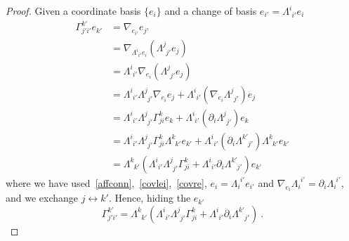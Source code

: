     \begin{proof}
        Given a coordinate basis $\{e_i\}$ and a change of basis $e_{i'} = \Lambda^{i}_{\phantom{i} i'} e_i$
        \begin{equation*}
        \begin{aligned}
            \Gamma^{k'}_{j'i'} e_{k'} & = \nabla_{e_{i'}} e_{j'} \\ & = \nabla_{\Lambda^{i}_{\phantom{i} i'} e_i} (\Lambda^{j}_{\phantom{j} j'} e_j) \\ & = \Lambda^{i}_{\phantom{i} i'} \nabla_{e_i} (\Lambda^{j}_{\phantom{j} j'} e_j) \\ & = \Lambda^{i}_{\phantom{i} i'} \Lambda^{j}_{\phantom{j} j'}\nabla_{e_i} e_j + \Lambda^{i}_{\phantom{i} i'}  (\nabla_{e_i} \Lambda^{j}_{\phantom{j} j'}) e_j \\ & = \Lambda^{i}_{\phantom{i} i'} \Lambda^{j}_{\phantom{j} j'} \Gamma^k_{ji} e_k + \Lambda^{i}_{\phantom{i} i'} (\partial_i \Lambda^{j}_{\phantom{j} j'}) e_k \\ & = \Lambda^{i}_{\phantom{i} i'} \Lambda^{j}_{\phantom{j} j'} \Gamma^k_{ji} \Lambda^{k}_{\phantom{k} k'} e_{k'} + \Lambda^{i}_{\phantom{i} i'} (\partial_i \Lambda^{k'}_{\phantom{k'} j'}) \Lambda^{k}_{\phantom{k} k'} e_{k'} \\ & = \Lambda^{k}_{\phantom{k} k'}(\Lambda^{i}_{\phantom{i} i'} \Lambda^{j}_{\phantom{j} j'} \Gamma^k_{ji} + \Lambda^{i}_{\phantom{i} i'} \partial_i \Lambda^{k'}_{\phantom{k'} j'} ) e_{k'} 
        \end{aligned}
        \end{equation*}
        where we have used~\eqref{affconn},~\eqref{covlei},~\eqref{covre}, $e_{i} = \Lambda_{i}^{\phantom{i} i'} e_{i'}$ and $\nabla_{e_i} \Lambda_{i}^{\phantom{i} i'} = \partial_i \Lambda_{i}^{\phantom{i} i'}$, and we exchange $j \leftrightarrow k'$. Hence, hiding the $e_{k'}$
        \begin{equation*}
            \Gamma^{k'}_{j'i'} = \Lambda^{k}_{\phantom{k} k'}(\Lambda^{i}_{\phantom{i} i'} \Lambda^{j}_{\phantom{j} j'} \Gamma^k_{ji} + \Lambda^{i}_{\phantom{i} i'} \partial_i \Lambda^{k'}_{\phantom{k'} j'} ) ~.
        \end{equation*}
    \end{proof}

